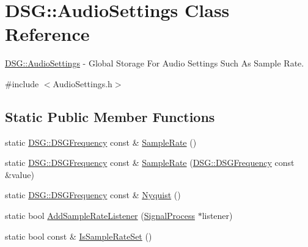 \hypertarget{class_d_s_g_1_1_audio_settings}{\section{D\+S\+G\+:\+:Audio\+Settings Class Reference}
\label{class_d_s_g_1_1_audio_settings}
}


\hyperlink{class_d_s_g_1_1_audio_settings}{D\+S\+G\+::\+Audio\+Settings} -\/ Global Storage For Audio Settings Such As Sample Rate.  




{\ttfamily \#include $<$Audio\+Settings.\+h$>$}

\subsection*{Static Public Member Functions}
\begin{DoxyCompactItemize}
\item 
static \hyperlink{namespace_d_s_g_a4315a061386fa1014fda09b15d3a6973}{D\+S\+G\+::\+D\+S\+G\+Frequency} const \& \hyperlink{class_d_s_g_1_1_audio_settings_a4f459c389b10c11828e2f2f00c012c49}{Sample\+Rate} ()
\item 
static \hyperlink{namespace_d_s_g_a4315a061386fa1014fda09b15d3a6973}{D\+S\+G\+::\+D\+S\+G\+Frequency} const \& \hyperlink{class_d_s_g_1_1_audio_settings_a9c5640e47b6eaa4331a0e5053abb1314}{Sample\+Rate} (\hyperlink{namespace_d_s_g_a4315a061386fa1014fda09b15d3a6973}{D\+S\+G\+::\+D\+S\+G\+Frequency} const \&value)
\item 
static \hyperlink{namespace_d_s_g_a4315a061386fa1014fda09b15d3a6973}{D\+S\+G\+::\+D\+S\+G\+Frequency} const \& \hyperlink{class_d_s_g_1_1_audio_settings_a8cb4afd7b58e927300ff46fbeb71bec7}{Nyquist} ()
\item 
static bool \hyperlink{class_d_s_g_1_1_audio_settings_ad60a89fec20cf5fd19d90fec1768dbae}{Add\+Sample\+Rate\+Listener} (\hyperlink{class_d_s_g_1_1_signal_process}{Signal\+Process} $\ast$listener)
\item 
static bool const \& \hyperlink{class_d_s_g_1_1_audio_settings_a5ff952756264670e4f3ca3661b4f9144}{Is\+Sample\+Rate\+Set} ()
\end{DoxyCompactItemize}

